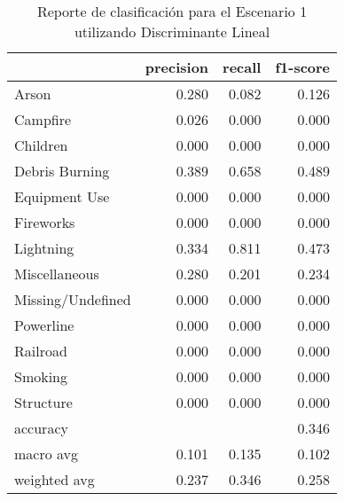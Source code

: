 \begin{table}
\centering
\caption{Reporte de clasificación para el Escenario 1 utilizando Discriminante Lineal}
\label{tab:DL_Escenario 1}
\begin{tabular}{lrrr}
\toprule
{} &  precision &  recall &  f1-score \\
\midrule
Arson             &      0.280 &   0.082 &     0.126 \\
Campfire          &      0.026 &   0.000 &     0.000 \\
Children          &      0.000 &   0.000 &     0.000 \\
Debris Burning    &      0.389 &   0.658 &     0.489 \\
Equipment Use     &      0.000 &   0.000 &     0.000 \\
Fireworks         &      0.000 &   0.000 &     0.000 \\
Lightning         &      0.334 &   0.811 &     0.473 \\
Miscellaneous     &      0.280 &   0.201 &     0.234 \\
Missing/Undefined &      0.000 &   0.000 &     0.000 \\
Powerline         &      0.000 &   0.000 &     0.000 \\
Railroad          &      0.000 &   0.000 &     0.000 \\
Smoking           &      0.000 &   0.000 &     0.000 \\
Structure         &      0.000 &   0.000 &     0.000 \\
accuracy          &            &         &     0.346 \\
macro avg         &      0.101 &   0.135 &     0.102 \\
weighted avg      &      0.237 &   0.346 &     0.258 \\
\bottomrule
\end{tabular}
\end{table}
